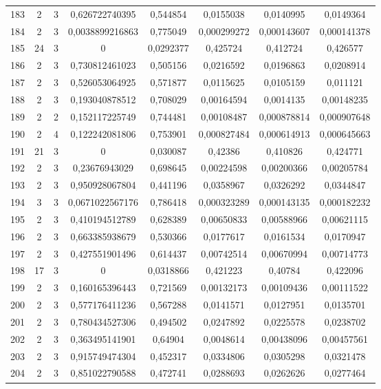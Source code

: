 \begin{longtable}{|c|c|c|c|c|c|c|c|}
183 & 2 & 3 & 0,626722740395 & 0,544854 & 0,0155038 & 0,0140995 & 0,0149364  \\
184 & 2 & 3 & 0,0038899216863 & 0,775049 & 0,000299272 & 0,000143607 & 0,000141378  \\
185 & 24 & 3 & 0 & 0,0292377 & 0,425724 & 0,412724 & 0,426577  \\
186 & 2 & 3 & 0,730812461023 & 0,505156 & 0,0216592 & 0,0196863 & 0,0208914  \\
187 & 2 & 3 & 0,526053064925 & 0,571877 & 0,0115625 & 0,0105159 & 0,011121  \\
188 & 2 & 3 & 0,193040878512 & 0,708029 & 0,00164594 & 0,0014135 & 0,00148235  \\
189 & 2 & 2 & 0,152117225749 & 0,744481 & 0,00108487 & 0,000878814 & 0,000907648  \\
190 & 2 & 4 & 0,122242081806 & 0,753901 & 0,000827484 & 0,000614913 & 0,000645663  \\
191 & 21 & 3 & 0 & 0,030087 & 0,42386 & 0,410826 & 0,424771  \\
192 & 2 & 3 & 0,23676943029 & 0,698645 & 0,00224598 & 0,00200366 & 0,00205784  \\
193 & 2 & 3 & 0,950928067804 & 0,441196 & 0,0358967 & 0,0326292 & 0,0344847  \\
194 & 3 & 3 & 0,0671022567176 & 0,786418 & 0,000323289 & 0,000143135 & 0,000182232  \\
195 & 2 & 3 & 0,410194512789 & 0,628389 & 0,00650833 & 0,00588966 & 0,00621115  \\
196 & 2 & 3 & 0,663385938679 & 0,530366 & 0,0177617 & 0,0161534 & 0,0170947  \\
197 & 2 & 3 & 0,427551901496 & 0,614437 & 0,00742514 & 0,00670994 & 0,00714773  \\
198 & 17 & 3 & 0 & 0,0318866 & 0,421223 & 0,40784 & 0,422096  \\
199 & 2 & 3 & 0,160165396443 & 0,721569 & 0,00132173 & 0,00109436 & 0,00111522  \\
200 & 2 & 3 & 0,577176411236 & 0,567288 & 0,0141571 & 0,0127951 & 0,0135701  \\
201 & 2 & 3 & 0,780434527306 & 0,494502 & 0,0247892 & 0,0225578 & 0,0238702  \\
202 & 2 & 3 & 0,363495141901 & 0,64904 & 0,0048614 & 0,00438096 & 0,00457561  \\
203 & 2 & 3 & 0,915749474304 & 0,452317 & 0,0334806 & 0,0305298 & 0,0321478  \\
204 & 2 & 3 & 0,851022790588 & 0,472741 & 0,0288693 & 0,0262626 & 0,0277464  \\

\end{longtable}
